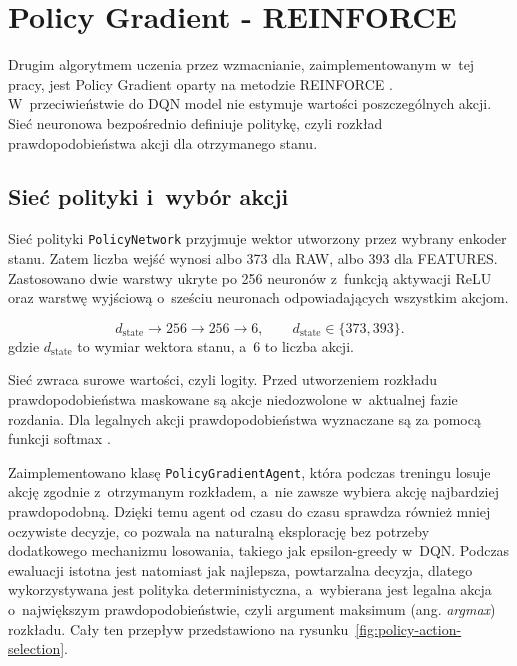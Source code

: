 \section{Policy Gradient - REINFORCE}
\label{sec:policy-gradient-reinforce}

Drugim algorytmem uczenia przez wzmacnianie, zaimplementowanym w~tej pracy,
jest Policy Gradient oparty na metodzie REINFORCE
\cite{williams_reinforce_1992,sutton_barto_rl}.
W~przeciwieństwie do DQN model nie estymuje wartości poszczególnych
akcji. Sieć neuronowa bezpośrednio definiuje politykę, czyli rozkład
prawdopodobieństwa akcji dla otrzymanego stanu.


\subsection{Sieć polityki i~wybór akcji}

Sieć polityki \texttt{PolicyNetwork} przyjmuje wektor utworzony przez
wybrany enkoder stanu. Zatem liczba wejść wynosi albo 373 dla
RAW, albo 393 dla FEATURES. Zastosowano dwie warstwy ukryte po
256 neuronów z~funkcją aktywacji ReLU oraz warstwę wyjściową
o~sześciu neuronach odpowiadających wszystkim akcjom.

\begin{equation}
    d_{\mathrm{state}}
    \rightarrow 256
    \rightarrow 256
    \rightarrow 6,
    \qquad
    d_{\mathrm{state}} \in \{373,393\}.
    \label{eq:pg-architecture}
\end{equation}
gdzie $d_{\mathrm{state}}$ to wymiar wektora stanu, a~6 to liczba akcji.

Sieć zwraca surowe wartości, czyli logity. Przed utworzeniem rozkładu
prawdopodobieństwa maskowane są akcje niedozwolone w~aktualnej fazie
rozdania. Dla legalnych akcji prawdopodobieństwa wyznaczane są za pomocą
funkcji softmax \cite{goodfellow_deep_learning_2016}.

Zaimplementowano klasę \texttt{PolicyGradientAgent}, która podczas
treningu losuje akcję zgodnie z~otrzymanym rozkładem, a~nie zawsze
wybiera akcję najbardziej prawdopodobną. Dzięki temu agent od czasu
do czasu sprawdza również mniej oczywiste decyzje, co pozwala na
naturalną eksplorację bez potrzeby dodatkowego mechanizmu losowania,
takiego jak epsilon-greedy w~DQN. Podczas ewaluacji istotna jest
natomiast jak najlepsza, powtarzalna decyzja, dlatego wykorzystywana jest
polityka deterministyczna, a~wybierana jest legalna akcja o~największym
prawdopodobieństwie, czyli argument maksimum (ang. \emph{argmax})
rozkładu. Cały ten przepływ przedstawiono na
rysunku~\ref{fig:policy-action-selection}.

